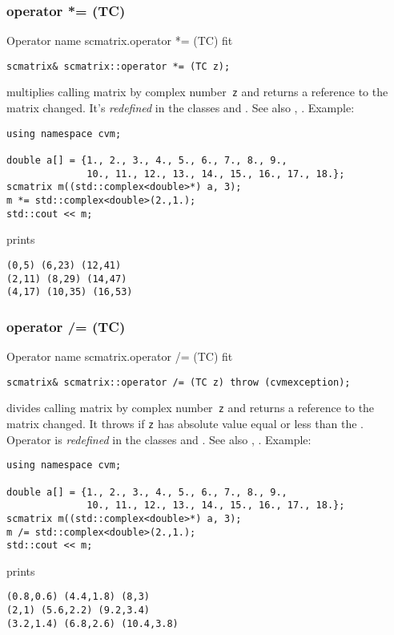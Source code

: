 \subsubsection{operator *= (TC)}
Operator%
\pdfdest name {scmatrix.operator *= (TC)} fit
\begin{verbatim}
scmatrix& scmatrix::operator *= (TC z);
\end{verbatim}
multiplies  calling matrix by  complex number~\verb"z"
and returns a reference to
the matrix changed.
It's \emph{redefined} in the classes
and .
See also ,
.
Example:
\begin{Verbatim}
using namespace cvm;

double a[] = {1., 2., 3., 4., 5., 6., 7., 8., 9.,
              10., 11., 12., 13., 14., 15., 16., 17., 18.};
scmatrix m((std::complex<double>*) a, 3);
m *= std::complex<double>(2.,1.);
std::cout << m;
\end{Verbatim}
prints
\begin{Verbatim}
(0,5) (6,23) (12,41)
(2,11) (8,29) (14,47)
(4,17) (10,35) (16,53)
\end{Verbatim}
\newpage



\subsubsection{operator /= (TC)}
Operator%
\pdfdest name {scmatrix.operator /= (TC)} fit
\begin{verbatim}
scmatrix& scmatrix::operator /= (TC z) throw (cvmexception);
\end{verbatim}
divides  calling matrix by  complex number~\verb"z"
and returns a reference to
the matrix changed.
It throws  
if \verb"z" has  absolute value equal or less
than the 
.
Operator is \emph{redefined} in the classes
and .
See also ,
.
Example:
\begin{Verbatim}
using namespace cvm;

double a[] = {1., 2., 3., 4., 5., 6., 7., 8., 9.,
              10., 11., 12., 13., 14., 15., 16., 17., 18.};
scmatrix m((std::complex<double>*) a, 3);
m /= std::complex<double>(2.,1.);
std::cout << m;
\end{Verbatim}
prints
\begin{Verbatim}
(0.8,0.6) (4.4,1.8) (8,3)
(2,1) (5.6,2.2) (9.2,3.4)
(3.2,1.4) (6.8,2.6) (10.4,3.8)
\end{Verbatim}
\newpage



